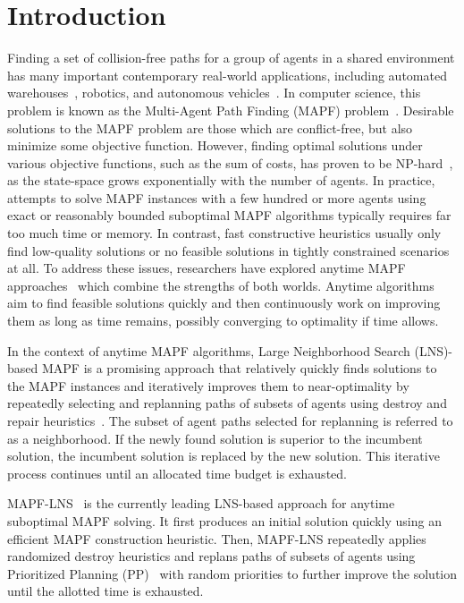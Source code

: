 \documentclass[runningheads]{llncs}
\begin{document}
\section{Introduction}

Finding a set of collision-free paths for a group of agents in a shared environment has many important contemporary real-world applications, including automated warehouses~\cite{wurman-2008}, robotics, and autonomous vehicles~\cite{veloso-2015}. In computer science, this problem is known as the Multi-Agent Path Finding (MAPF) problem~\cite{stern-2019}. Desirable solutions to the MAPF problem are those which are  conflict-free, but also minimize some objective function. However, finding optimal solutions under various objective functions, such as the sum of costs, has proven to be NP-hard~\cite{yu-2013}, as the state-space grows exponentially with the number of agents. In practice, attempts to solve MAPF instances with a few hundred or more agents using exact or reasonably bounded suboptimal MAPF algorithms typically requires far too much time or memory. In contrast, fast constructive heuristics usually only find low-quality solutions or no feasible solutions in tightly constrained scenarios at all. To address these issues, researchers have explored anytime MAPF approaches~\cite{cohen-2018,li-2021,lam-2023} which combine the strengths of both worlds. Anytime algorithms aim to find feasible solutions quickly and then continuously work on improving them as long as time remains, possibly converging to optimality if time allows.

In the context of anytime MAPF algorithms, Large Neighborhood Search (LNS)-based MAPF is a promising approach that relatively quickly finds solutions to the MAPF instances and iteratively improves them to near-optimality by repeatedly selecting and replanning paths of subsets of agents using destroy and repair heuristics~\cite{li-2021}. The subset of agent paths selected for replanning is referred to as a neighborhood. If the newly found solution is superior to the incumbent solution, the incumbent solution is replaced by the new solution. This iterative process continues until an allocated time budget is exhausted.

MAPF-LNS~\cite{li-2021} is the currently leading LNS-based approach for anytime suboptimal MAPF solving. It first produces an initial solution quickly using an efficient MAPF construction heuristic. Then, MAPF-LNS repeatedly applies randomized destroy heuristics and replans paths of subsets of agents using Prioritized Planning (PP)~\cite{silver-2005} with random
priorities to further improve the solution until the allotted time is exhausted.
\end{document}

